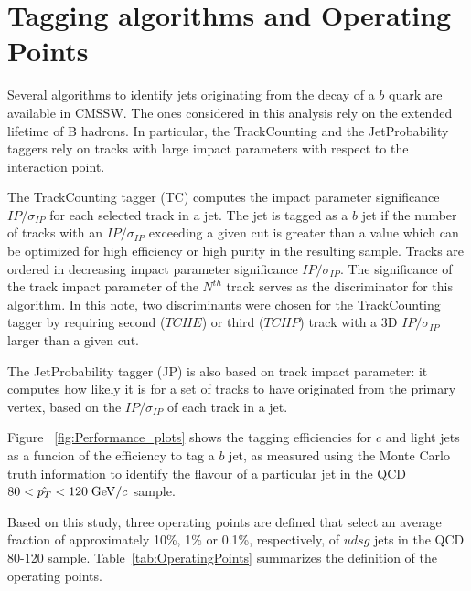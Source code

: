 \section{Tagging algorithms and Operating Points}
\label{sec:taggingalgos}
Several algorithms to identify jets originating from 
the decay of a $b$ quark are available in CMSSW. The ones considered in this 
analysis rely on the extended lifetime of B hadrons. In particular, the 
TrackCounting and the JetProbability taggers rely on tracks with large impact 
parameters with respect to the interaction point. 

The TrackCounting tagger (TC) computes the impact parameter significance 
$IP/\sigma_{IP}$ for each selected track in a jet. The jet is tagged as a 
$b$ jet if the number of tracks with an $IP/\sigma_{IP}$ exceeding a given 
cut is greater than a value which can be optimized for high efficiency or
high purity in the resulting sample. Tracks are ordered in decreasing 
impact parameter significance $IP/\sigma_{IP}$. The significance of the track
impact parameter of the $N^{th} $ track serves as the discriminator for this 
algorithm.
In this note, two discriminants were chosen for the TrackCounting tagger by 
requiring second ($TCHE$) or third ($TCHP$) track with a 3D $IP/\sigma_{IP}$ 
larger than a given cut.

The JetProbability tagger (JP) is also based on track impact parameter:
it computes how likely it is for a set of tracks to have originated from the 
primary vertex, based on the $IP/\sigma_{IP}$ of each track in a jet. 

Figure ~\ref{fig:Performance_plots} shows the tagging efficiencies for $c$ and 
light jets as a funcion of the efficiency to tag a $b$ jet, as measured  
using the Monte Carlo truth information to identify the flavour of a 
particular jet in the QCD $80<\hat{p_T}<120\;{\rm GeV}/c$ sample. 

Based on this study, three operating points are defined that select 
an average fraction of approximately 10\%, 1\% or 0.1\%, 
respectively, of $udsg$ jets in the QCD 80-120 sample.
Table~\ref{tab:OperatingPoints} summarizes 
the definition of the operating points.

